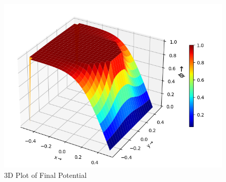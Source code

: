 \documentclass{article}
\begin{document}
\begin{figure}[ht!]
\centering
\includegraphics[scale=0.6]{plots/The 3-D surface plot of the potential.png}
\caption{3D Plot of Final Potential}
\label{fig:3D Plot of Potential}
\end{figure}

\newpage
\end{document}
